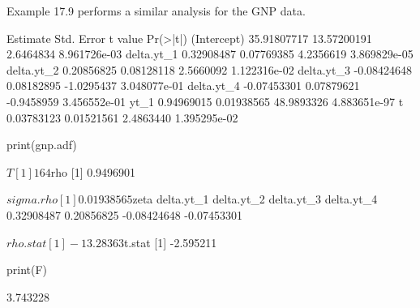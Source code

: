 \documentclass[a4paper]{article}
\begin{document}
Example 17.9 performs a similar analysis for the GNP data. 
\begin{Schunk}
\begin{Soutput}
               Estimate  Std. Error    t value     Pr(>|t|)
(Intercept) 35.91807717 13.57200191  2.6464834 8.961726e-03
delta.yt_1   0.32908487  0.07769385  4.2356619 3.869829e-05
delta.yt_2   0.20856825  0.08128118  2.5660092 1.122316e-02
delta.yt_3  -0.08424648  0.08182895 -1.0295437 3.048077e-01
delta.yt_4  -0.07453301  0.07879621 -0.9458959 3.456552e-01
yt_1         0.94969015  0.01938565 48.9893326 4.883651e-97
t            0.03783123  0.01521561  2.4863440 1.395295e-02
\end{Soutput}
\begin{Sinput}
 print(gnp.adf)
\end{Sinput}
\begin{Soutput}
$T
[1] 164

$rho
[1] 0.9496901

$sigma.rho
[1] 0.01938565

$zeta
 delta.yt_1  delta.yt_2  delta.yt_3  delta.yt_4 
 0.32908487  0.20856825 -0.08424648 -0.07453301 

$rho.stat
[1] -13.28363

$t.stat
[1] -2.595211
\end{Soutput}
\begin{Sinput}
 print(F)
\end{Sinput}
\begin{Soutput}
[1] 3.743228
\end{Soutput}
\end{Schunk}
\end{document}

